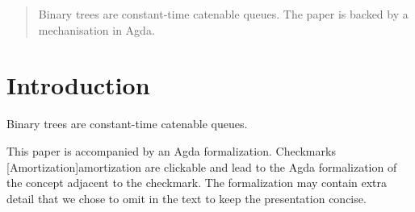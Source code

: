 \documentclass[svgnames,dvipsnames,table,review%
]{jfp-epi}
\begin{document}


\begin{abstract}
  Binary trees are constant-time catenable queues.
  The paper is backed by a mechanisation
  in Agda.
\end{abstract}


\maketitle




\section{Introduction}\label{sec:intro}

Binary trees are constant-time catenable queues.

This paper is accompanied by an Agda formalization.
Checkmarks [Amortization]{amortization} are clickable and lead to the Agda formalization of the concept adjacent to the checkmark.  The formalization may contain extra detail that we chose to omit in the text to keep the presentation concise.
\end{document}
